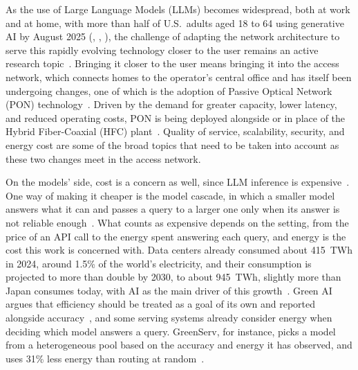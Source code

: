 \documentclass[cic,dipl,english]{infufrgs}
\begin{document}
As the use of Large Language Models (LLMs) becomes widespread, both at work and at
home, with more than half of U.S.\ adults aged 18 to 64 using
generative AI by August 2025 (\citeauthor{bick2025state}, \citeyear{bick2025state}, \citeyear{bick2026rapid}), the challenge of adapting the network architecture to serve
this rapidly evolving technology closer to the user remains an active research
topic~\cite{chen2026network}. Bringing it closer to the user means bringing it into the access
network, which connects homes to the operator's central office and has itself been undergoing
changes, one of which is the adoption of Passive Optical Network (PON)
technology~\cite{effenberger2007introduction}. Driven by the demand for greater capacity,
lower latency, and reduced operating costs, PON is being deployed alongside or in place
of the Hybrid Fiber-Coaxial (HFC) plant~\cite{prodnik2025migration}. Quality of service,
scalability, security, and energy cost are some of the broad topics that need to be taken
into account as these two changes meet in the access network.

On the models' side, cost is a concern as well, since LLM inference is
expensive~\cite{chen2026network}. One way of making it cheaper is the model cascade,
in which a smaller model answers what it can and passes a query to a larger one only when
its answer is not reliable enough~\cite{chen2024frugalgpt}. What counts as expensive
depends on the setting, from the price of an API call to the energy spent answering
each query, and energy is the cost this work is concerned with. Data centers already
consumed about 415~TWh in 2024, around 1.5\% of the world's electricity, and their
consumption is projected to more than double by 2030, to about 945~TWh, slightly more
than Japan consumes today, with AI as the main driver of this
growth~\cite{iea2025energy}. Green AI argues that efficiency should be treated as a goal
of its own and reported alongside accuracy~\cite{schwartz2020green}, and some serving
systems already consider energy when
deciding which model answers a query. GreenServ, for instance, picks a model from a heterogeneous
pool based on the accuracy and energy it has observed, and uses 31\% less energy than
routing at random~\cite{ziller2026greenserv}.
\end{document}
